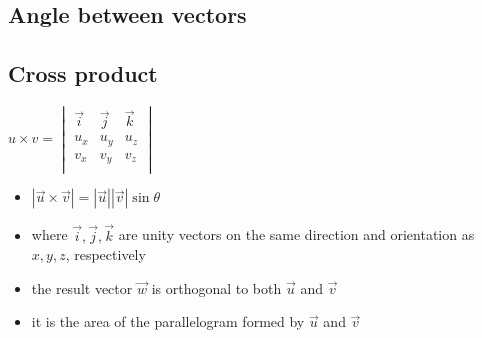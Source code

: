 
\subsection{Angle between vectors}

\subsection{Cross product}

$
            u\times v = \begin{vmatrix}
                \vec{i} & \vec{j} & \vec{k} \\
                u_x & u_y & u_z \\
                v_x & v_y & v_z \\
            \end{vmatrix}
$
\begin{itemize}
\item $|\vec{u}\times \vec{v}| = |\vec{u}||\vec{v}|\sin \theta$
\item where $\vec{i}, \vec{j}, \vec{k}$ are unity vectors on the same direction and orientation as $x, y, z$, respectively
\item the result vector $\vec{w}$ is orthogonal to both $\vec{u}$ and $\vec{v}$
\item it is the area of the parallelogram formed by $\vec{u}$ and $\vec{v}$
\end{itemize}


